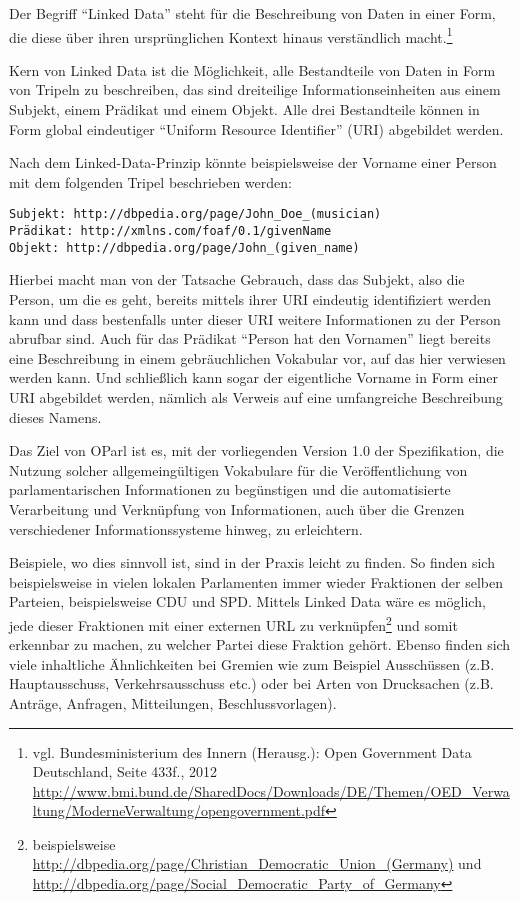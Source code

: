\documentclass[,a4paper]{article}
\begin{document}

Der Begriff ``Linked Data'' steht für die Beschreibung von Daten in
einer Form, die diese über ihren ursprünglichen Kontext hinaus
verständlich macht.\footnote{vgl. Bundesministerium des Innern
  (Herausg.): Open Government Data Deutschland, Seite 433f., 2012
  \url{http://www.bmi.bund.de/SharedDocs/Downloads/DE/Themen/OED_Verwaltung/ModerneVerwaltung/opengovernment.pdf}}

Kern von Linked Data ist die Möglichkeit, alle Bestandteile von Daten in
Form von Tripeln zu beschreiben, das sind dreiteilige
Informationseinheiten aus einem Subjekt, einem Prädikat und einem
Objekt. Alle drei Bestandteile können in Form global eindeutiger
``Uniform Resource Identifier'' (URI) abgebildet werden.

Nach dem Linked-Data-Prinzip könnte beispielsweise der Vorname einer
Person mit dem folgenden Tripel beschrieben werden:

\begin{verbatim}
Subjekt: http://dbpedia.org/page/John_Doe_(musician)
Prädikat: http://xmlns.com/foaf/0.1/givenName
Objekt: http://dbpedia.org/page/John_(given_name)
\end{verbatim}

Hierbei macht man von der Tatsache Gebrauch, dass das Subjekt, also die
Person, um die es geht, bereits mittels ihrer URI eindeutig
identifiziert werden kann und dass bestenfalls unter dieser URI weitere
Informationen zu der Person abrufbar sind. Auch für das Prädikat
``Person hat den Vornamen'' liegt bereits eine Beschreibung in einem
gebräuchlichen Vokabular vor, auf das hier verwiesen werden kann. Und
schließlich kann sogar der eigentliche Vorname in Form einer URI
abgebildet werden, nämlich als Verweis auf eine umfangreiche
Beschreibung dieses Namens.

Das Ziel von OParl ist es, mit der vorliegenden Version 1.0 der
Spezifikation, die Nutzung solcher allgemeingültigen Vokabulare für die
Veröffentlichung von parlamentarischen Informationen zu begünstigen und
die automatisierte Verarbeitung und Verknüpfung von Informationen, auch
über die Grenzen verschiedener Informationssysteme hinweg, zu
erleichtern.

Beispiele, wo dies sinnvoll ist, sind in der Praxis leicht zu finden. So
finden sich beispielsweise in vielen lokalen Parlamenten immer wieder
Fraktionen der selben Parteien, beispielsweise CDU und SPD. Mittels
Linked Data wäre es möglich, jede dieser Fraktionen mit einer externen
URL zu verknüpfen\footnote{beispielsweise
  \url{http://dbpedia.org/page/Christian_Democratic_Union_(Germany)} und
  \url{http://dbpedia.org/page/Social_Democratic_Party_of_Germany}} und
somit erkennbar zu machen, zu welcher Partei diese Fraktion gehört.
Ebenso finden sich viele inhaltliche Ähnlichkeiten bei Gremien wie zum
Beispiel Ausschüssen (z.B. Hauptausschuss, Verkehrsausschuss etc.) oder
bei Arten von Drucksachen (z.B. Anträge, Anfragen, Mitteilungen,
Beschlussvorlagen).
\end{document}
